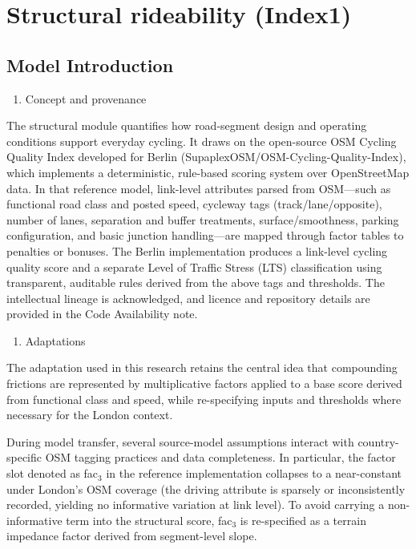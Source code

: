 \documentclass[
  12pt,
  oneside]{book}
\providecommand{\tightlist}{%
  \setlength{\itemsep}{0pt}\setlength{\parskip}{0pt}}
\begin{document}
\section{Structural rideability (Index1)}\label{structural-rideability-index1}

\subsection{Model Introduction}\label{model-introduction}

\begin{enumerate}
\def\labelenumi{\arabic{enumi}.}
\tightlist
\item
  Concept and provenance
\end{enumerate}

The structural module quantifies how road-segment design and operating conditions support everyday cycling. It draws on the open-source OSM Cycling Quality Index developed for Berlin (SupaplexOSM/OSM-Cycling-Quality-Index), which implements a deterministic, rule-based scoring system over OpenStreetMap data. In that reference model, link-level attributes parsed from OSM---such as functional road class and posted speed, cycleway tags (track/lane/opposite), number of lanes, separation and buffer treatments, surface/smoothness, parking configuration, and basic junction handling---are mapped through factor tables to penalties or bonuses. The Berlin implementation produces a link-level cycling quality score and a separate Level of Traffic Stress (LTS) classification using transparent, auditable rules derived from the above tags and thresholds. The intellectual lineage is acknowledged, and licence and repository details are provided in the Code Availability note.

\begin{enumerate}
\def\labelenumi{\arabic{enumi}.}
\setcounter{enumi}{1}
\tightlist
\item
  Adaptations
\end{enumerate}

The adaptation used in this research retains the central idea that compounding frictions are represented by multiplicative factors applied to a base score derived from functional class and speed, while re-specifying inputs and thresholds where necessary for the London context.

During model transfer, several source-model assumptions interact with country-specific OSM tagging practices and data completeness. In particular, the factor slot denoted as fac\(_3\) in the reference implementation collapses to a near-constant under London's OSM coverage (the driving attribute is sparsely or inconsistently recorded, yielding no informative variation at link level). To avoid carrying a non-informative term into the structural score, fac\(_3\) is re-specified as a terrain impedance factor derived from segment-level slope.
\end{document}
